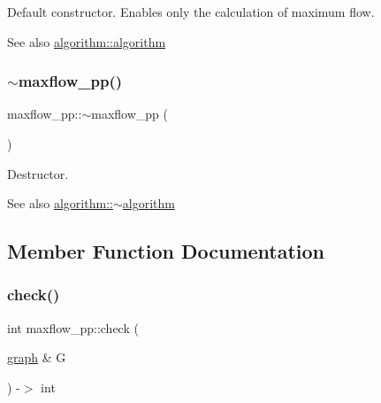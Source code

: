 Default constructor. Enables only the calculation of maximum flow.

\begin{DoxySeeAlso}{See also}
\mbox{\hyperlink{classalgorithm_ab79e1ddec2f2afdf4b36b10724db8b15}{algorithm\+::algorithm}} 
\end{DoxySeeAlso}
\mbox{\label{classmaxflow__pp_a2f96bfeea4cb2c044d155d356d72452a}} 
\subsubsection{\texorpdfstring{$\sim$maxflow\+\_\+pp()}{~maxflow\_pp()}}
{\footnotesize\ttfamily maxflow\+\_\+pp\+::$\sim$maxflow\+\_\+pp (\begin{DoxyParamCaption}{ }\end{DoxyParamCaption})\hspace{0.3cm}{\ttfamily [virtual]}}

Destructor.

\begin{DoxySeeAlso}{See also}
\mbox{\hyperlink{classalgorithm_adca9b1e7fa3afd914519a9dbb44e9fd5}{algorithm\+::$\sim$algorithm}} 
\end{DoxySeeAlso}


\subsection{Member Function Documentation}
\mbox{\label{classmaxflow__pp_a1535468f547b80ea750432f5e27c338d}} 
\subsubsection{\texorpdfstring{check()}{check()}}
{\footnotesize\ttfamily int maxflow\+\_\+pp\+::check (\begin{DoxyParamCaption}\item[{\mbox{\hyperlink{classgraph}{graph}} \&}]{G }\end{DoxyParamCaption}) -\/$>$ int\hspace{0.3cm}{\ttfamily [virtual]}}

